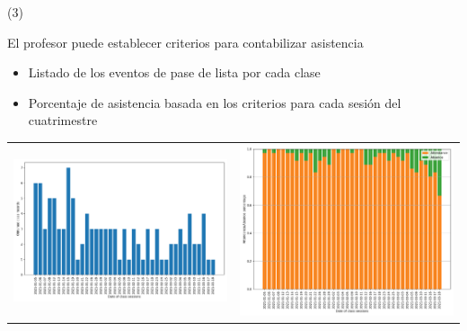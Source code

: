 \begin{frame}{\citetitle{\EntradaBibtex} (3)}

El profesor puede establecer criterios para contabilizar asistencia
\begin{itemize}
\item Listado de los eventos de pase de lista por cada clase
\item Porcentaje de asistencia basada en los criterios para cada sesión del cuatrimestre
\end{itemize}
\begin{center}
	\begin{tabular}{cc}
		\includegraphics[width=0.40\linewidth]{2021_ListaOnLine/figs/Pases-608.png} &
		\includegraphics[width=0.40\linewidth]{2021_ListaOnLine/figs/Pases-608-Stacked.png} \\
	\end{tabular}
\end{center}

\end{frame}

